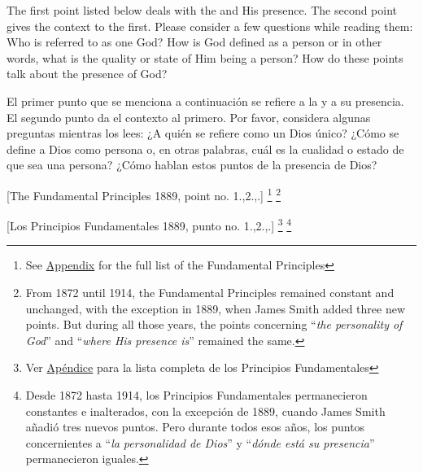 The first point listed below deals with the  and His presence. The second point gives the context to the first. Please consider a few questions while reading them: Who is referred to as one God? How is God defined as a person or in other words, what is the quality or state of Him being a person? How do these points talk about the presence of God?


El primer punto que se menciona a continuación se refiere a la  y a su presencia. El segundo punto da el contexto al primero. Por favor, considera algunas preguntas mientras los lees: ¿A quién se refiere como un Dios único? ¿Cómo se define a Dios como persona o, en otras palabras, cuál es la cualidad o estado de que sea una persona? ¿Cómo hablan estos puntos de la presencia de Dios?






[The Fundamental Principles 1889, point no. 1.,2.,.] \footnote{See \hyperref[chap:appendix]{Appendix} for the full list of the Fundamental Principles} \footnote{From 1872 until 1914, the Fundamental Principles remained constant and unchanged, with the exception in 1889, when James Smith added three new points. But during all those years, the points concerning “\textit{the personality of God}” and “\textit{where His presence is}” remained the same. }


[Los Principios Fundamentales 1889, punto no. 1.,2.,.] \footnote{Ver \hyperref[chap:appendix]{Apéndice} para la lista completa de los Principios Fundamentales} \footnote{Desde 1872 hasta 1914, los Principios Fundamentales permanecieron constantes e inalterados, con la excepción de 1889, cuando James Smith añadió tres nuevos puntos. Pero durante todos esos años, los puntos concernientes a “\textit{la personalidad de Dios}” y “\textit{dónde está su presencia}” permanecieron iguales. }


